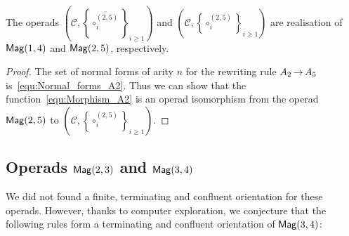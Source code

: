 \begin{Proposition} \label{prop:Realisation_Mag_1_4}
The operads
$\left(\mathcal{C}, \left\{\overline{\circ_i^{(2,5)}}\right\}_{i \geq 1}
\right)$ and
$\left(\mathcal{C}, \left\{\circ_i^{(2,5)}\right\}_{i \geq 1}\right)$
are realisation of $\mathsf{Mag}(1,4)$ and $\mathsf{Mag}(2,5)$, respectively.
\end{Proposition}

\begin{proof}
The set of normal forms of arity $n$ for the rewriting rule
$A_2 \operatorname{\to} A_5$ is~\eqref{equ:Normal_forms_A2}. Thus we can show that
 the function~\eqref{equ:Morphism_A2}
is an operad isomorphism from the operad $\mathsf{Mag}(2,5)$ to
$\left(\mathcal{C}, \left\{\circ_i^{(2,5)}\right\}_{i \geq 1}\right)$.
\end{proof}

\subsection{Operads \texorpdfstring{$\mathsf{Mag}(2,3)$}{Mag(2,3)} and
\texorpdfstring{$\mathsf{Mag}(3,4)$}{Mag(3,4)}}
We did not found a finite, terminating and confluent orientation
for these operads. However, thanks to computer exploration, we
conjecture that the following rules form a terminating and confluent
orientation of $\mathsf{Mag}(3,4)$:
